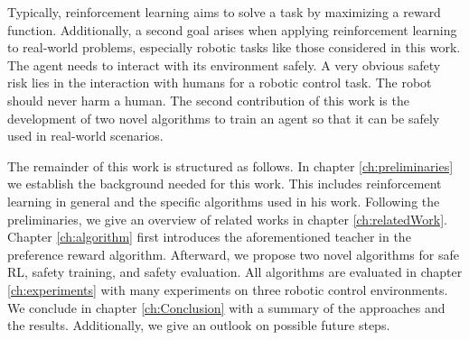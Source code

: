 Typically, reinforcement learning aims to solve a task by maximizing a reward function. Additionally, a second goal arises when applying reinforcement learning to real-world problems, especially robotic tasks like those considered in this work. The agent needs to interact with its environment safely. A very obvious safety risk lies in the interaction with humans for a robotic control task. The robot should never harm a human. The second contribution of this work is the development of two novel algorithms to train an agent so that it can be safely used in real-world scenarios.

The remainder of this work is structured as follows. In chapter \ref{ch:preliminaries} we establish the background needed for this work. This includes reinforcement learning in general and the specific algorithms used in his work. Following the preliminaries, we give an overview of related works in chapter \ref{ch:relatedWork}. Chapter \ref{ch:algorithm} first introduces the aforementioned teacher in the preference reward algorithm. Afterward, we propose two novel algorithms for safe RL, safety training, and safety evaluation. All algorithms are evaluated in chapter \ref{ch:experiments} with many experiments on three robotic control environments. We conclude in chapter \ref{ch:Conclusion} with a summary of the approaches and the results. Additionally, we give an outlook on possible future steps.
